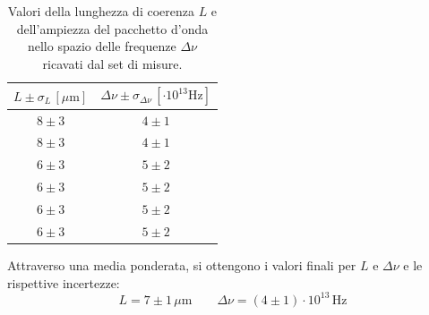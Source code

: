 \documentclass[]{article}
\begin{document}
\begin{table}[H]
    \centering
    \begin{tabular}{||c|c||}
        \hline
        $L \pm \sigma_{L} \, \left[\mu\text{m}\right]$ & $\Delta \nu \pm \sigma_{\Delta \nu} \, \left[\cdot 10^{13}\text{Hz}\right]$ \\
        \hline\hline

        $8 \pm 3$ & $4 \pm 1$ \\\hline
        $8 \pm 3$ & $4 \pm 1$ \\\hline
        $6 \pm 3$ & $5 \pm 2$ \\\hline
        $6 \pm 3$ & $5 \pm 2$ \\\hline
        $6 \pm 3$ & $5 \pm 2$ \\\hline
        $6 \pm 3$ & $5 \pm 2$ \\\hline
    
    \end{tabular}
    \caption{Valori della lunghezza di coerenza $L$ e dell'ampiezza del pacchetto d'onda nello spazio delle frequenze $\Delta \nu$ ricavati dal set di misure.}
    \label{tab:L}
\end{table}
Attraverso una media ponderata, si ottengono i valori finali per $L$ e $\Delta \nu$ e le rispettive incertezze:
\begin{equation}
    \label{L-deltanu}
    L = 7 \pm 1 \, \mu\text{m} \qquad
    \Delta\nu = (4 \pm 1) \cdot 10^{13} \, \text{Hz}
\end{equation}
\end{document}
